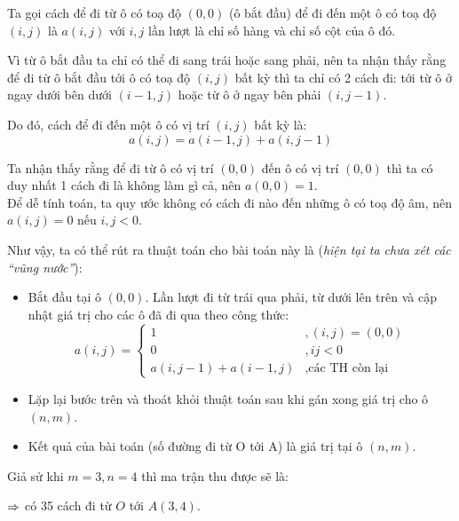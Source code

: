 \documentclass[main.tex]{subfiles}
\begin{document}
Ta gọi cách để đi từ ô có toạ độ $(0, 0)$ (ô bắt đầu) để đi đến một ô có toạ độ $(i,j)$ là $a(i, j)$ với $i, j$ lần lượt là chỉ số hàng và chỉ số cột của ô đó.

Vì từ ô bắt đầu ta chỉ có thể đi sang trái hoặc sang phải, nên ta nhận thấy rằng để đi từ ô bắt đầu tới ô có toạ độ $(i,j)$ bất kỳ thì ta chỉ có 2 cách đi: tới từ ô ở ngay dưới bên dưới $(i-1,j)$ hoặc từ ô ở ngay bên phải $(i,j-1)$. \par Do đó, cách để đi đến một ô có vị trí $(i, j)$ bất kỳ là:
$$
a(i, j) = a(i-1, j) + a(i, j-1)
$$

\par Ta nhận thấy rằng để đi từ ô có vị trí $(0, 0)$ đến ô có vị trí $(0, 0)$ thì ta có duy nhất 1 cách đi là không làm gì cả, nên $a(0,0) = 1$. \\ Để dễ tính toán, ta quy ước không có cách đi nào đến những ô có toạ độ âm, nên $a(i, j) = 0$ nếu $i, j < 0$. 

Như vậy, ta có thể rút ra thuật toán cho bài toán này là (\textit{hiện tại ta chưa xét các ``vũng nước''}):
\begin{itemize}
    \item Bắt đầu tại ô $(0, 0)$. Lần lượt đi từ trái qua phải, từ dưới lên trên và cập nhật giá trị cho các ô đã đi qua theo công thức:
    $$
    a(i,j) = \begin{cases}
        1 &, (i, j) = (0, 0) \\
        0 &, ij < 0 \\
        a(i, j-1) + a(i-1,j) &, \text{các TH còn lại}    
    \end{cases}
    $$
    \item Lặp lại bước trên và thoát khỏi thuật toán sau khi gán xong giá trị cho ô $(n, m)$.
    \item Kết quả của bài toán (số đường đi từ O tới A) là giá trị tại ô $(n,m)$.
\end{itemize}
\pagebreak
Giả sử khi $m=3, n=4$ thì ma trận thu được sẽ là:
\begin{figure}[H]
    \centering
\end{figure}
$\Rightarrow$ có 35 cách đi từ $O$ tới $A(3,4)$.
\end{document}
